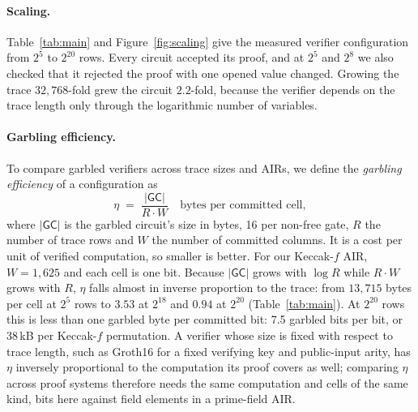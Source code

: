 \documentclass[11pt]{article}
\begin{document}
\paragraph{Scaling.} Table~\ref{tab:main} and Figure~\ref{fig:scaling} give the
measured verifier configuration from $2^5$ to $2^{20}$ rows. Every circuit accepted its proof, and
at $2^5$ and $2^8$ we also checked that it rejected the proof with one opened
value changed. Growing the trace $32{,}768$-fold grew the circuit $2.2$-fold,
because the verifier depends on the trace length only through the logarithmic
number of variables.

\paragraph{Garbling efficiency.} To compare garbled verifiers across trace sizes
and AIRs, we define the \emph{garbling efficiency} of a configuration as
\[
  \eta \;=\; \frac{|\mathsf{GC}|}{R\cdot W}\quad\text{bytes per committed cell},
\]
where $|\mathsf{GC}|$ is the garbled circuit's size in bytes, 16 per non-free
gate, $R$ the number of trace rows and $W$ the number of committed columns. It is a
cost per unit of verified computation, so smaller is better. For our Keccak-$f$
AIR, $W=1{,}625$ and each cell is one bit. Because $|\mathsf{GC}|$ grows with
$\log R$ while $R\cdot W$ grows with $R$, $\eta$ falls almost in inverse
proportion to the trace: from $13{,}715$ bytes per cell at $2^5$ rows to $3.53$ at
$2^{18}$ and $0.94$ at $2^{20}$ (Table~\ref{tab:main}). At $2^{20}$ rows this is
less than one garbled byte per committed bit: 7.5 garbled bits per bit, or
38\,kB per Keccak-$f$ permutation. A verifier whose size is fixed with respect
to trace length, such as Groth16 for a fixed verifying key and public-input
arity, has $\eta$ inversely proportional to the computation its proof covers as
well; comparing $\eta$ across proof systems therefore needs the same
computation and cells of the same kind, bits here against field elements in a
prime-field AIR.
\end{document}
